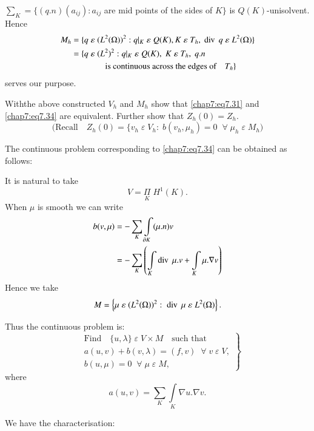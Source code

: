 $\sum_K=\{(q.n)(a_{ij}):a_{ij}$ are mid points of the sides of $K\}$
is $Q(K)$-unisolvent. Hence 
\begin{align*}
M_h &= \{q\;\varepsilon \;(L^2(\Omega))^2:q|_K\;\varepsilon \;Q(K),K
\;\varepsilon \;T_h,\;\operatorname{div} \;q\;\varepsilon \;L^2(\Omega)\}\\
&= \{q\;\varepsilon \;(L^2)^2:q|_K\;\varepsilon
\;Q(K),\;K\;\varepsilon \;T_h, \;q.n\\
&\qquad\qquad\text{is continuous across
  the edges of}\quad T_h\}
\end{align*}
serves our purpose.

\begin{exercise}\label{chap7:exr4}
With\pageoriginale the above constructed $V_h$ and $M_h$ show that
\eqref{chap7:eq7.31} and \eqref{chap7:eq7.34} are equivalent. Further
show that $Z_h(0)=Z_h$. 
$$
\text{(Recall}\quad Z_h(0)=\{v_h\;\varepsilon \;V_h:\;b(v_h,\mu_h)=0
\; \;\forall \;\mu_h\;\varepsilon \;M_h)
$$ 
\end{exercise}

 The continuous problem corresponding to \eqref{chap7:eq7.34} 
can be obtained as follows:

It is natural to take 
$$
V=\underset{K}{\Pi}\;H^1(K).
$$
When $\mu$ is smooth we can write 
\begin{align*}
b(v,\mu) &= -\sum\limits_K \int\limits_{\partial K}(\mu.n)v\\
&= -\sum\limits_K\left(\int\limits_K\operatorname{div} \;\mu.v+ \int\limits_K
\mu.\nabla v\right)
\end{align*}
Hence we take 
$$
M=\left\{\mu\;\varepsilon \;(L^2(\Omega))^2:\;\operatorname{div} \;\mu \;\varepsilon
\;L^2(\Omega)\right\}.
$$

Thus the continuous problem is:
\begin{equation}\label{chap7:eq7.35}
\left.
\begin{aligned}
&\text{Find}\quad\{u,\lambda\}\;\varepsilon \;V\times M\quad
\text{such that}\\
&a(u,v)+b(v,\lambda)=(f,v)\; \; \forall \;v\;\varepsilon \;V,\\
&b(u,\mu)=0\; \; \forall \;\mu \;\varepsilon \;M,
\end{aligned}
\right\}
\end{equation}
where
$$
a(u,v)=\sum\limits_K\int\limits_K\nabla u.\nabla v.
$$

We have the characterisation:

